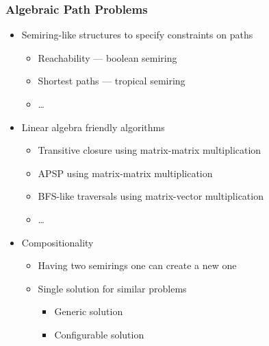 \documentclass[xcolor=table,aspectratio=169]{beamer}
\begin{document}
\begin{frame}[fragile]
  \frametitle{Algebraic Path Problems}  
    \begin{itemize}
      \item Semiring-like structures to specify constraints on paths
      \begin{itemize}
        \item Reachability --- boolean semiring
        \item Shortest paths --- tropical semiring
        \item \ldots
      \end{itemize}
      \pause
      \item Linear algebra friendly algorithms 
      \begin{itemize}
        \item Transitive closure using matrix-matrix multiplication
        \item APSP using matrix-matrix multiplication
        \item BFS-like traversals using matrix-vector multiplication
        \item \ldots
      \end{itemize}
      \pause
      \item Compositionality
      \begin{itemize}
        \item Having two semirings one can create a new one
        \item Single solution for similar problems
        \begin{itemize}
          \item Generic solution
          \item Configurable solution
        \end{itemize}
      \end{itemize}
    \end{itemize}     
\end{frame}
\end{document}
